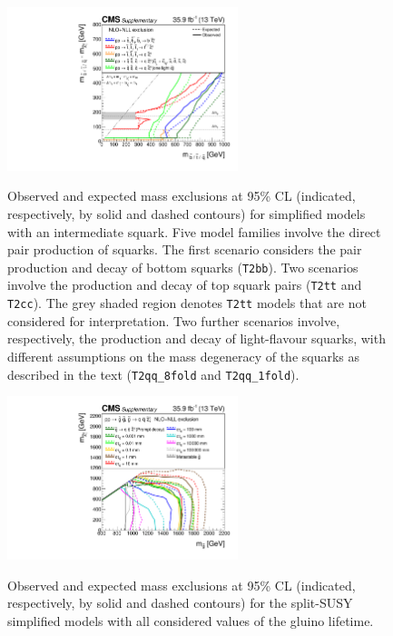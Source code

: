\clearpage
\begin{figure}[!t]
  \centering
  \includegraphics[width=0.6\textwidth]{Supplementary/squarkZoomSUMMARY_transpose}\\
  \caption{Observed and expected mass exclusions at 95\% CL
    (indicated, respectively, by solid and dashed contours) for
    simplified models with an intermediate squark.
    Five model families involve the direct pair
    production of squarks. The first scenario considers the pair
    production and decay of bottom squarks (\texttt{T2bb}). Two
    scenarios involve the production and decay of top squark pairs
    (\texttt{T2tt} and \texttt{T2cc}). The grey shaded region denotes
    \texttt{T2tt} models that are not considered for
    interpretation. Two further scenarios involve, respectively, the 
    production and decay of light-flavour squarks, with different
    assumptions on the mass degeneracy of the squarks as described in
    the text (\texttt{T2qq\_8fold} and \texttt{T2qq\_1fold}).}
  \label{fig:limits-sms_aux_squarks} 
\end{figure}

\begin{figure}[!t]
  \centering
  \includegraphics[width=0.6\textwidth]{Supplementary/splitAllSUMMARY}\\
  \caption{Observed and expected mass exclusions at 95\% CL
    (indicated, respectively, by solid and dashed contours) for
    the split-SUSY simplified models with all considered values of the gluino lifetime.}
  \label{fig:limits-sms_aux_long_lived} 
\end{figure}

